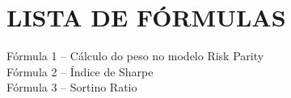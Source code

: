 
\chapter*{LISTA DE FÓRMULAS}

\vspace{1cm}

\noindent
Fórmula 1 -- Cálculo do peso no modelo Risk Parity \\
Fórmula 2 -- Índice de Sharpe \\
Fórmula 3 -- Sortino Ratio 